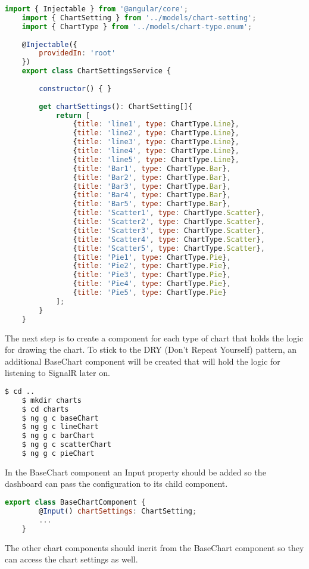 \begin{lstlisting}[language=JavaScript]
	import { Injectable } from '@angular/core';
	import { ChartSetting } from '../models/chart-setting';
	import { ChartType } from '../models/chart-type.enum';
	
	@Injectable({
		providedIn: 'root'
	})
	export class ChartSettingsService {
		
		constructor() { }
		
		get chartSettings(): ChartSetting[]{
			return [
				{title: 'line1', type: ChartType.Line},
				{title: 'line2', type: ChartType.Line},
				{title: 'line3', type: ChartType.Line},
				{title: 'line4', type: ChartType.Line},
				{title: 'line5', type: ChartType.Line},
				{title: 'Bar1', type: ChartType.Bar},
				{title: 'Bar2', type: ChartType.Bar},
				{title: 'Bar3', type: ChartType.Bar},
				{title: 'Bar4', type: ChartType.Bar},
				{title: 'Bar5', type: ChartType.Bar},
				{title: 'Scatter1', type: ChartType.Scatter},
				{title: 'Scatter2', type: ChartType.Scatter},
				{title: 'Scatter3', type: ChartType.Scatter},
				{title: 'Scatter4', type: ChartType.Scatter},
				{title: 'Scatter5', type: ChartType.Scatter},
				{title: 'Pie1', type: ChartType.Pie},
				{title: 'Pie2', type: ChartType.Pie},
				{title: 'Pie3', type: ChartType.Pie},
				{title: 'Pie4', type: ChartType.Pie},
				{title: 'Pie5', type: ChartType.Pie}
			];
		}
	}
\end{lstlisting}

The next step is to create a component for each type of chart that holds the logic for drawing the chart. To stick to the DRY (Don't Repeat Yourself) pattern, an additional BaseChart component will be created that will hold the logic for listening to SignalR later on.

\begin{lstlisting}[language=bash]
	$ cd ..
	$ mkdir charts
	$ cd charts
	$ ng g c baseChart
	$ ng g c lineChart
	$ ng g c barChart
	$ ng g c scatterChart
	$ ng g c pieChart
\end{lstlisting}

In the BaseChart component an Input property should be added so the dashboard can pass the configuration to its child component.

\begin{lstlisting}[language=JavaScript]
	export class BaseChartComponent {
		@Input() chartSettings: ChartSetting;
		...
	}
\end{lstlisting}

The other chart components should inerit from the BaseChart component so they can access the chart settings as well.

